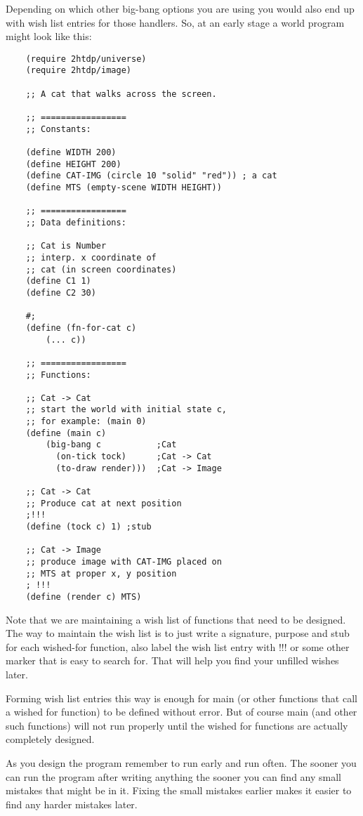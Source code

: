 \documentclass[11pt,a4paper]{report}
\begin{document}
	Depending on which other big-bang options you are using you would also end up with wish list
	entries for those handlers. So, at an early stage a world program might look like this:
	
	\begin{verbatim}
	(require 2htdp/universe)
	(require 2htdp/image)
	
	;; A cat that walks across the screen.
	
	;; =================
	;; Constants:
	
	(define WIDTH 200)
	(define HEIGHT 200)
	(define CAT-IMG (circle 10 "solid" "red")) ; a cat
	(define MTS (empty-scene WIDTH HEIGHT))
	
	;; =================
	;; Data definitions:
	
	;; Cat is Number
	;; interp. x coordinate of
	;; cat (in screen coordinates)
	(define C1 1)
	(define C2 30)
	
	#;
	(define (fn-for-cat c)
		(... c))
	
	;; =================
	;; Functions:
	
	;; Cat -> Cat
	;; start the world with initial state c,
	;; for example: (main 0)
	(define (main c)
		(big-bang c           ;Cat
		  (on-tick tock)      ;Cat -> Cat
		  (to-draw render)))  ;Cat -> Image
		
	;; Cat -> Cat
	;; Produce cat at next position
	;!!!
	(define (tock c) 1) ;stub
	
	;; Cat -> Image
	;; produce image with CAT-IMG placed on
	;; MTS at proper x, y position
	; !!!
	(define (render c) MTS)
	\end{verbatim}
	
	Note that we are maintaining a wish list of functions that need to be designed. The way to
	maintain the wish list is to just write a signature, purpose and stub for each wished-for function,
	also label the wish list entry with !!! or some other marker that is easy to search for. That will
	help you find your unfilled wishes later.
	
	Forming wish list entries this way is enough for main (or other functions that call a wished for
	function) to be defined without error. But of course main (and other such functions) will not run
	properly until the wished for functions are actually completely designed.
	
	As you design the program remember to run early and run often. The sooner you can run the
	program after writing anything the sooner you can find any small mistakes that might be in it.
	Fixing the small mistakes earlier makes it easier to find any harder mistakes later.
	
\end{document}
